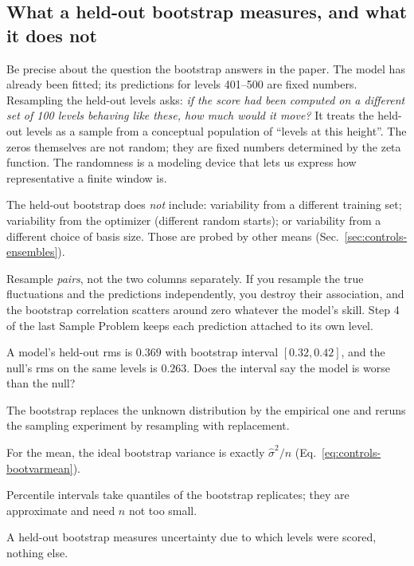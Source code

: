 \subsection{What a held-out bootstrap measures, and what it does not}

Be precise about the question the bootstrap answers in the paper. The model has already been fitted; its predictions for levels 401--500 are fixed numbers. Resampling the held-out levels asks: \emph{if the score had been computed on a different set of 100 levels behaving like these, how much would it move?} It treats the held-out levels as a sample from a conceptual population of ``levels at this height''. The zeros themselves are not random; they are fixed numbers determined by the zeta function. The randomness is a modeling device that lets us express how representative a finite window is.

The held-out bootstrap does \emph{not} include: variability from a different training set; variability from the optimizer (different random starts); or variability from a different choice of basis size. Those are probed by other means (Sec.~\ref{sec:controls-ensembles}).

\begin{pitfall}
Resample \emph{pairs}, not the two columns separately. If you resample the true fluctuations and the predictions independently, you destroy their association, and the bootstrap correlation scatters around zero whatever the model's skill. Step 4 of the last Sample Problem keeps each prediction attached to its own level.
\end{pitfall}

\begin{checkpoint}
A model's held-out rms is $0.369$ with bootstrap interval $[0.32,0.42]$, and the null's rms on the same levels is $0.263$. Does the interval say the model is worse than the null?
\end{checkpoint}

\begin{keyideas}
\item The bootstrap replaces the unknown distribution by the empirical one and reruns the sampling experiment by resampling with replacement.
\item For the mean, the ideal bootstrap variance is exactly $\hat\sigma^2/n$ (Eq.~\eqref{eq:controls-bootvarmean}).
\item Percentile intervals take quantiles of the bootstrap replicates; they are approximate and need $n$ not too small.
\item A held-out bootstrap measures uncertainty due to which levels were scored, nothing else.
\end{keyideas}

